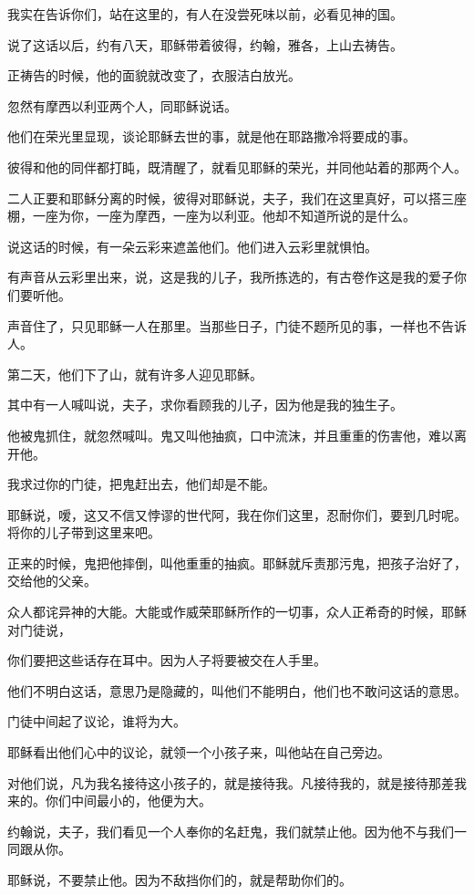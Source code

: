\documentclass[12pt,oneside]{book}
\begin{document}
我实在告诉你们，站在这里的，有人在没尝死味以前，必看见神的国。

说了这话以后，约有八天，耶稣带着彼得，约翰，雅各，上山去祷告。

正祷告的时候，他的面貌就改变了，衣服洁白放光。

忽然有摩西以利亚两个人，同耶稣说话。

他们在荣光里显现，谈论耶稣去世的事，就是他在耶路撒冷将要成的事。

彼得和他的同伴都打盹，既清醒了，就看见耶稣的荣光，并同他站着的那两个人。

二人正要和耶稣分离的时候，彼得对耶稣说，夫子，我们在这里真好，可以搭三座棚，一座为你，一座为摩西，一座为以利亚。他却不知道所说的是什么。

说这话的时候，有一朵云彩来遮盖他们。他们进入云彩里就惧怕。

有声音从云彩里出来，说，这是我的儿子，我所拣选的，有古卷作这是我的爱子你们要听他。

声音住了，只见耶稣一人在那里。当那些日子，门徒不题所见的事，一样也不告诉人。

第二天，他们下了山，就有许多人迎见耶稣。

其中有一人喊叫说，夫子，求你看顾我的儿子，因为他是我的独生子。

他被鬼抓住，就忽然喊叫。鬼又叫他抽疯，口中流沫，并且重重的伤害他，难以离开他。

我求过你的门徒，把鬼赶出去，他们却是不能。

耶稣说，嗳，这又不信又悖谬的世代阿，我在你们这里，忍耐你们，要到几时呢。将你的儿子带到这里来吧。

正来的时候，鬼把他摔倒，叫他重重的抽疯。耶稣就斥责那污鬼，把孩子治好了，交给他的父亲。

众人都诧异神的大能。大能或作威荣耶稣所作的一切事，众人正希奇的时候，耶稣对门徒说，

你们要把这些话存在耳中。因为人子将要被交在人手里。

他们不明白这话，意思乃是隐藏的，叫他们不能明白，他们也不敢问这话的意思。

门徒中间起了议论，谁将为大。

耶稣看出他们心中的议论，就领一个小孩子来，叫他站在自己旁边。

对他们说，凡为我名接待这小孩子的，就是接待我。凡接待我的，就是接待那差我来的。你们中间最小的，他便为大。

约翰说，夫子，我们看见一个人奉你的名赶鬼，我们就禁止他。因为他不与我们一同跟从你。

耶稣说，不要禁止他。因为不敌挡你们的，就是帮助你们的。
\end{document}

